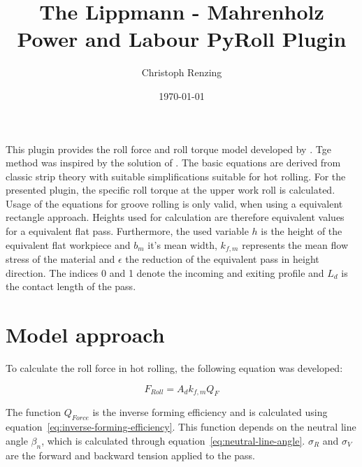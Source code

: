 \documentclass[11pt]{PyRollDocs}
\begin{document}
    \title{The Lippmann - Mahrenholz Power and Labour PyRoll Plugin}
    \author{Christoph Renzing}
    \date{\today}

    \maketitle

    This plugin provides the roll force and roll torque model developed by \textcite{Lippmann_Mahrenholtz_1967}.
    Tge method was inspired by the solution of \textcite{Sims1954}.
    The basic equations are derived from classic strip theory with suitable simplifications suitable for hot rolling.
    For the presented plugin, the specific roll torque at the upper work roll is calculated.
    Usage of the equations for groove rolling is only valid, when using a equivalent rectangle approach.
    Heights used for calculation are therefore equivalent values for a equivalent flat pass.
    Furthermore, the used variable $h$ is the height of the equivalent flat workpiece and $b_m$ it's mean width,
    $k_{f,m}$ represents the mean flow stress of the material and $\epsilon$ the reduction of the equivalent pass in height direction.
    The indices 0 and 1 denote the incoming and exiting profile and $L_d$ is the contact length of the pass.


    \section{Model approach}\label{sec:model-approach}

    To calculate the roll force in hot rolling, the following equation was developed:

    \begin{equation}
        F_{Roll} = A_d k_{f,m} Q_F
        \label{eq:lippmann-mahrenholz-force}
    \end{equation}

    The function $Q_{Force}$ is the inverse forming efficiency and is calculated using equation~\eqref{eq:inverse-forming-efficiency}.
    This function depends on the neutral line angle $\beta_n$, which is calculated through equation~\eqref{eq:neutral-line-angle}.
    $\sigma_R$ and $\sigma_V$ are the forward and backward tension applied to the pass.
\end{document}
